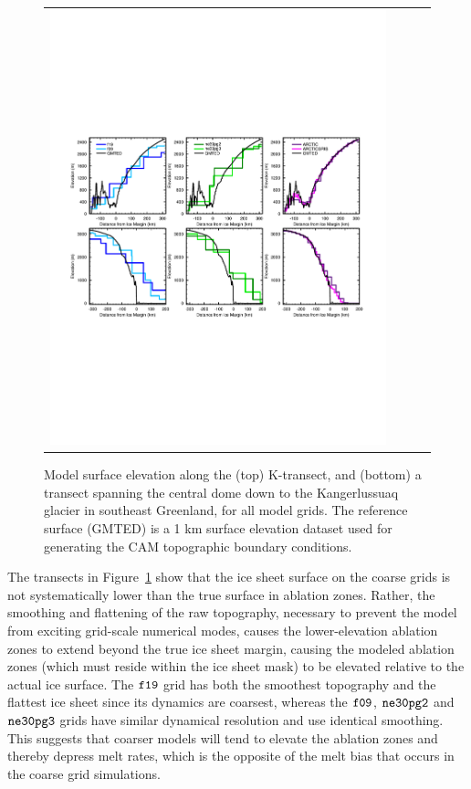 \documentclass[draft]{agujournal2019}
\begin{document}
\begin{figure}[t]
\begin{center}
\begin{tabular}{cccc}
         \includegraphics[width=130mm]{figs/temp_zsects.pdf}
\end{tabular}
\end{center}
\caption{Model surface elevation along the (top) K-transect, and (bottom) a transect spanning the central dome down to the Kangerlussuaq glacier in southeast Greenland, for all model grids. The reference surface (GMTED) is a 1 km surface elevation dataset used for generating the CAM topographic boundary conditions. }
\label{fig:ztrans}
\end{figure}

The transects in Figure~\ref{fig:ztrans} show that the ice sheet surface on the coarse grids is not systematically lower than the true surface in ablation zones. Rather, the smoothing and flattening of the raw topography, necessary to prevent the model from exciting grid-scale numerical modes, causes the lower-elevation ablation zones to extend beyond the true ice sheet margin, causing the modeled ablation zones (which must reside within the ice sheet mask) to be elevated relative to the actual ice surface. The $\tt f19$ grid has both the smoothest topography and the flattest ice sheet since its dynamics are coarsest, whereas the $\tt f09$, $\tt ne30pg2$ and $\tt ne30pg3$ grids have similar dynamical resolution and use identical smoothing. This suggests that coarser models will tend to elevate the ablation zones and thereby depress melt rates, which is the opposite of the melt bias that occurs in the coarse grid simulations.
\end{document}
